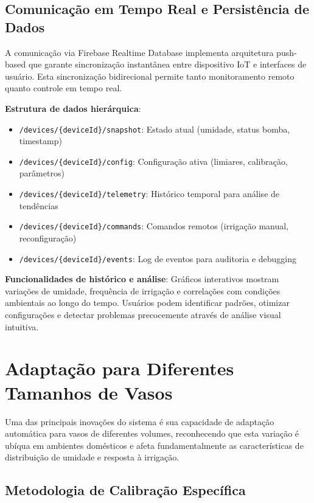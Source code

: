 \documentclass[twoside,english,brazilian]{UNISINOSmonografia}
\begin{document}
\subsection{Comunicação em Tempo Real e Persistência de Dados}

A comunicação via Firebase Realtime Database implementa arquitetura push-based que garante sincronização instantânea entre dispositivo IoT e interfaces de usuário. Esta sincronização bidirecional permite tanto monitoramento remoto quanto controle em tempo real.

\textbf{Estrutura de dados hierárquica}:
\begin{itemize}
\item \texttt{/devices/\{deviceId\}/snapshot}: Estado atual (umidade, status bomba, timestamp)
\item \texttt{/devices/\{deviceId\}/config}: Configuração ativa (limiares, calibração, parâmetros)
\item \texttt{/devices/\{deviceId\}/telemetry}: Histórico temporal para análise de tendências
\item \texttt{/devices/\{deviceId\}/commands}: Comandos remotos (irrigação manual, reconfiguração)
\item \texttt{/devices/\{deviceId\}/events}: Log de eventos para auditoria e debugging
\end{itemize}

\textbf{Funcionalidades de histórico e análise}: Gráficos interativos mostram variações de umidade, frequência de irrigação e correlações com condições ambientais ao longo do tempo. Usuários podem identificar padrões, otimizar configurações e detectar problemas precocemente através de análise visual intuitiva.

\section{Adaptação para Diferentes Tamanhos de Vasos}

Uma das principais inovações do sistema é sua capacidade de adaptação automática para vasos de diferentes volumes, reconhecendo que esta variação é ubíqua em ambientes domésticos e afeta fundamentalmente as características de distribuição de umidade e resposta à irrigação.

\subsection{Metodologia de Calibração Específica}
\end{document}
